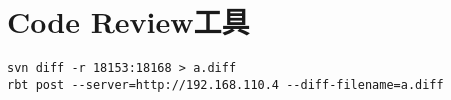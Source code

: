 \section{Code Review工具}

\begin{verbatim}
svn diff -r 18153:18168 > a.diff
rbt post --server=http://192.168.110.4 --diff-filename=a.diff
\end{verbatim}
